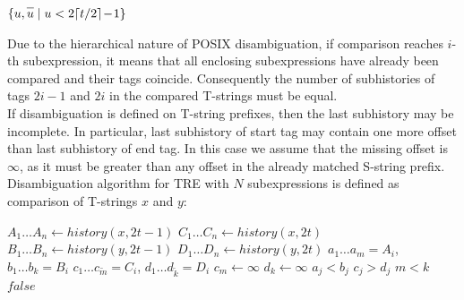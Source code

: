 \documentclass{article}
\newcommand{\Xset}{\!\leftarrow\!}
\newcommand{\Xeq}{\!=\!}
\newcommand*{\Xbar}[1]{\overline{#1\vphantom{\bar{#1}}}}
\theoremstyle{definition}
\begin{document}
\begin{multicols}{2}
    \begin{algorithm}[H] \DontPrintSemicolon {} 
     {
        \Return $\{ u, \Xbar{u} \mid u < 2 \lceil t / 2 \rceil \!-\! 1 \}$ \;
    }
    \end{algorithm}

Due to the hierarchical nature of POSIX disambiguation, if comparison reaches $i$-th subexpression,
it means that all enclosing subexpressions have already been compared and their tags coincide.
Consequently the number of subhistories of tags $2i - 1$ and $2i$ in the compared T-strings must be equal.
\\

If disambiguation is defined on T-string prefixes, then the last subhistory may be incomplete.
In particular, last subhistory of start tag may contain one more offset than last subhistory of end tag.
In this case we assume that the missing offset is $\infty$, as it must be greater than any offset in the already matched S-string prefix.
\\

Disambiguation algorithm for TRE with $N$ subexpressions is defined as comparison of T-strings $x$ and $y$:

    \begin{algorithm}[H] \DontPrintSemicolon {}   
     {
        \For {$t \Xeq \overline{1, N}$} {
            $A_1 \dots A_n \Xset history(x, 2t \!-\! 1)$ \;
            $C_1 \dots C_n \Xset history(x, 2t)$ \;
            $B_1 \dots B_n \Xset history(y, 2t \!-\! 1)$ \;
            $D_1 \dots D_n \Xset history(y, 2t)$ \;
            \For {$i \Xeq \overline{1, n}$} {
                \Let $a_1 \dots a_m \Xeq A_i$, $b_1 \dots b_k \Xeq B_i$ \;
                \Let $c_1 \dots c_{\widetilde{m}} \Xeq C_i$, $d_1 \dots d_{\widetilde{k}} \Xeq D_i$ \;
                 {$c_m \Xset \infty$}
                 {$d_k \Xset \infty$}
                \For {$j \Xeq \overline{1, min(m, k)}$} {
                     {\Return $a_j \!<\! b_j$}
                     {\Return $c_j \!>\! d_j$}
                }
                 {\Return $m \!<\! k$}
            }
        }
        \Return $false$ \;
    }
    \end{algorithm}





\end{multicols}
\end{document}
